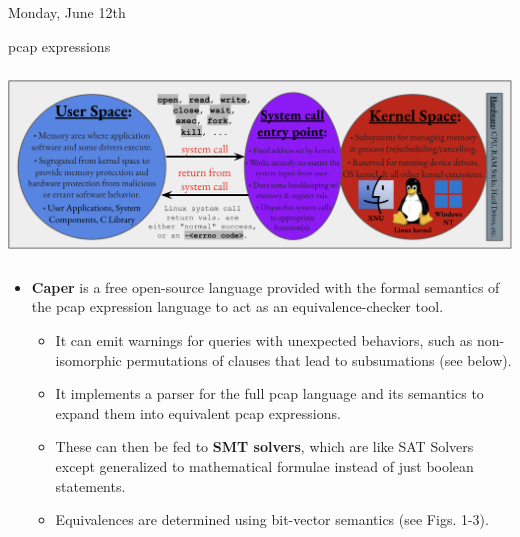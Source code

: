 \documentclass[11pt]{article}
\begin{document}
\begin{shininggoldbox}{Monday, June 12th\vspace{-2.2em}\begin{flushright}\large pcap expressions \end{flushright}}
\begin{itemize}
\end{itemize}
\vspace{-3em}
\begin{center}
    \includegraphics[width = 15.5cm, height = 5cm]{User and Kernel Space.png}
\end{center}
\vspace{-2em}
\begin{itemize}
    \item\textbf{Caper} is a free open-source language provided with the formal semantics of the pcap expression language to act as an equivalence-checker tool.
    \vspace{-0.75em}
    \begin{itemize}
        \item It can emit warnings for queries with unexpected behaviors, such as non-isomorphic permutations of clauses that lead to subsumations (see below).
        \item It implements a parser for the full pcap language and its semantics to expand them into equivalent pcap expressions.
        \item These can then be fed to \textbf{SMT solvers}, which are like SAT Solvers except generalized to mathematical formulae instead of just boolean statements.
        \item Equivalences are determined using bit-vector semantics (see Figs. 1-3).
    \end{itemize}
\end{itemize}
\end{shininggoldbox}

\begin{center}
\vspace{-0.25em}
\hspace{0.2cm}
\vspace{-0.4em}
\end{center}
\end{document}
